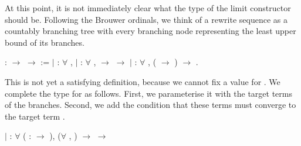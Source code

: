 At this point, it is not immediately clear what the type of the limit
constructor should be. Following the Brouwer ordinals, we think of a rewrite
sequence as a countably branching tree with every branching node representing
the least upper bound of its branches.
\begin{singlespace}
\begin{coqdoccode}
\coqdocnoindent
{}
 :
 \ensuremath{\rightarrow}
 \ensuremath{\rightarrow}
 :=\coqdoceol
\coqdocindent{1.00em}
\ensuremath{|}  :
\ensuremath{\forall} , 
\coqdoceol \coqdocindent{1.00em}
\ensuremath{|}  :
\ensuremath{\forall}   , 
 
$\rightarrow$
 
 $\rightarrow$ 
\coqdoceol \coqdocindent{1.00em}
\ensuremath{|}    :
\ensuremath{\forall}  ,
(
\ensuremath{\rightarrow} 
) $\rightarrow$
.\coqdoceol
\end{coqdoccode}
\end{singlespace}

This is not yet a satisfying definition, because we cannot fix a value for
. We complete the type for
 as follows. First, we
parameterise it with the target terms of the branches. Second, we add the
condition that these terms must converge to the target term
.
\begin{singlespace}
\begin{coqdoccode}
\coqdocindent{1.00em}
\ensuremath{|}  :
\ensuremath{\forall}  
( :
\ensuremath{\rightarrow} ),
(\ensuremath{\forall} , 
 ) $\rightarrow$
 
 $\rightarrow$
\coqdoceol
\end{coqdoccode}
\end{singlespace}

